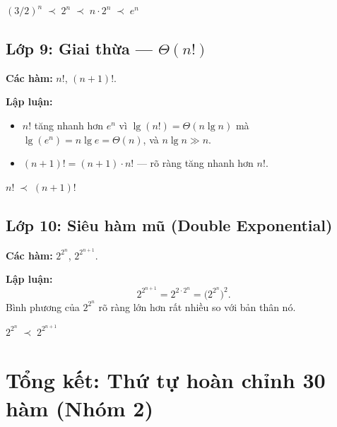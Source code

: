 ﻿\documentclass[12pt,a4paper]{article}
\begin{document}
\begin{resultbox}
$(3/2)^n \;\prec\; 2^n \;\prec\; n \cdot 2^n \;\prec\; e^n$
\end{resultbox}

\subsection{Lớp 9: Giai thừa --- $\Theta(n!)$}

\textbf{Các hàm:} $n!$, \;\; $(n+1)!$.

\textbf{Lập luận:}
\begin{itemize}
  \item $n!$ tăng nhanh hơn $e^n$ vì $\lg(n!) = \Theta(n\lg n)$ mà $\lg(e^n) = n\lg e = \Theta(n)$, và $n\lg n \gg n$.
  \item $(n+1)! = (n+1) \cdot n!$ --- rõ ràng tăng nhanh hơn $n!$.
\end{itemize}

\begin{resultbox}
$n! \;\prec\; (n+1)!$
\end{resultbox}

\subsection{Lớp 10: Siêu hàm mũ (Double Exponential)}

\textbf{Các hàm:} $2^{2^n}$, \;\; $2^{2^{n+1}}$.

\textbf{Lập luận:}
\[
  2^{2^{n+1}} = 2^{2 \cdot 2^n} = \bigl(2^{2^n}\bigr)^2.
\]
Bình phương của $2^{2^n}$ rõ ràng lớn hơn rất nhiều so với bản thân nó.

\begin{resultbox}
$2^{2^n} \;\prec\; 2^{2^{n+1}}$
\end{resultbox}

\newpage
\section*{Tổng kết: Thứ tự hoàn chỉnh 30 hàm (Nhóm 2)}
\end{document}
